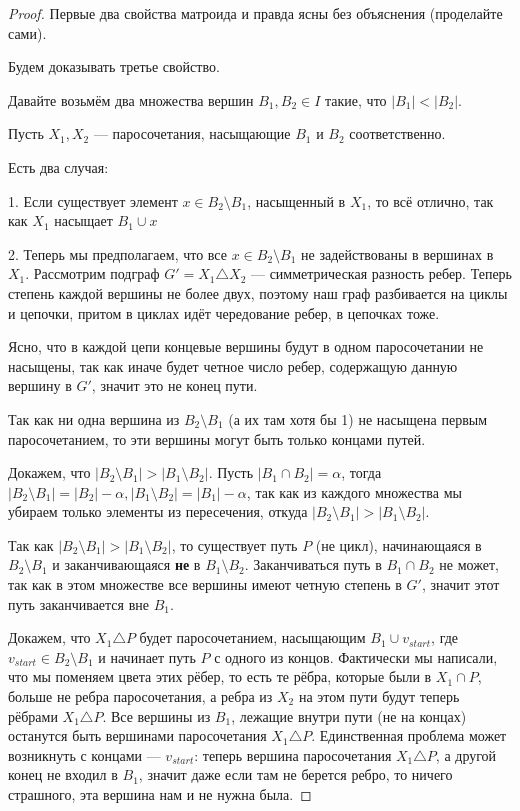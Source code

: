\begin{proof}
  Первые два свойства матроида и правда ясны без объяснения (проделайте сами).

  Будем доказывать третье свойство.

  Давайте возьмём два множества вершин $B_1, B_2 \in I$ такие, что $|B_1| < |B_2|$.

  Пусть $X_1, X_2$ --- паросочетания, насыщающие $B_1$ и $B_2$ 
  соответственно.

  Есть два случая:

  1. Если существует элемент $x \in B_2 \setminus B_1$, насыщенный в $X_1$, то всё
  отлично, так как $X_1$ насыщает $B_1 \cup x$ 

  2. Теперь мы предполагаем, что все $x \in B_2 \setminus B_1$ не задействованы
  в вершинах в $X_1$. Рассмотрим подграф $G' = X_1 \triangle X_2$ --- 
  симметрическая разность ребер. Теперь степень каждой вершины не более двух, поэтому
  наш граф разбивается на циклы и цепочки, притом в циклах идёт чередование ребер,
  в цепочках тоже.

  Ясно, что в каждой цепи концевые вершины будут в одном паросочетании не насыщены, так
  как иначе будет 
  четное число ребер, содержащую данную вершину в $G'$, значит это не конец пути.

  Так как ни одна вершина из $B_2 \setminus B_1$ (а их там хотя бы 1) не насыщена
  первым паросочетанием, то эти вершины могут быть только концами путей.

  Докажем, что $|B_2 \setminus B_1| > |B_1 \setminus B_2|$. Пусть $|B_1 \cap B_2| 
  = \alpha$, тогда $|B_2 \setminus B_1| = |B_2| - \alpha, |B_1 \setminus B_2| = 
  |B_1| - \alpha$, так как из каждого множества мы убираем только элементы из 
  пересечения, откуда $|B_2 \setminus B_1| > |B_1 \setminus B_2|$.

  Так как $|B_2 \setminus B_1| > |B_1 \setminus B_2|$, то существует путь $P$ (не
  цикл),
  начинающаяся в $B_2 \setminus B_1$ и заканчивающаяся {\bf не} в $B_1 \setminus
  B_2$. Заканчиваться путь в $B_1 \cap B_2$ не может, так как в этом множестве все
  вершины имеют четную степень в $G'$, значит этот путь заканчивается вне $B_1$.

  Докажем, что $X_1 \triangle P$ будет паросочетанием, насыщающим 
  $B_1 \cup v_{start}$, где $v_{start} \in B_2 \setminus B_1$ и начинает путь 
  $P$ с одного из концов. Фактически мы написали, что мы поменяем цвета этих
  рёбер, то есть те рёбра, которые были в $X_1 \cap P$, больше не ребра паросочетания,
  а ребра из $X_2$ на этом пути будут теперь рёбрами $X_1 \triangle P$. Все вершины из
  $B_1$,
  лежащие внутри пути (не на концах) останутся быть вершинами паросочетания 
  $X_1 \triangle P$. Единственная проблема может возникнуть с концами --- $v_{start}$:
  теперь вершина паросочетания $X_1 \triangle P$, а другой конец не входил в $B_1$,
  значит даже если там не берется ребро, то ничего страшного, эта вершина нам и не
  нужна была.
\end{proof}

